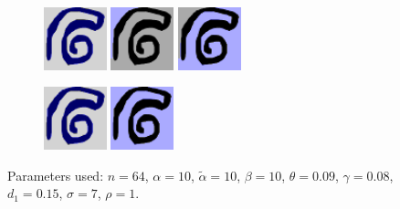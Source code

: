 \documentclass[12pt]{article}%
\begin{document}
\begin{figure}

\begin{subfigure}[b]{\textwidth}
\centering
\includegraphics[width=0.2\textwidth,height=0.2\textwidth]{spiral_bad_seg_1.png} \hspace{.45cm}
\includegraphics[width=0.2\textwidth,height=0.2\textwidth]{spiral_bad_seg_2.png} \hspace{.45cm}
\includegraphics[width=0.2\textwidth,height=0.2\textwidth]{spiral_bad_seg_3.png}
\end{subfigure}

\vspace{.45cm}

\begin{subfigure}[b]{\textwidth}
\centering
\includegraphics[width=0.2\textwidth,height=0.2\textwidth]{spiral_good_seg_1.png} \hspace{.45cm}
\includegraphics[width=0.2\textwidth,height=0.2\textwidth]{spiral_good_seg_2.png}
\end{subfigure}

\caption{Parameters used: $n = 64$, $\alpha = 10$, $\tilde{\alpha} = 10$, $\beta = 10$, $\theta = 0.09$, $\gamma = 0.08$, $d_1 = 0.15$, $\sigma = 7$, $\rho = 1$.}
\label{fig:spiral}

\end{figure}
\end{document}
